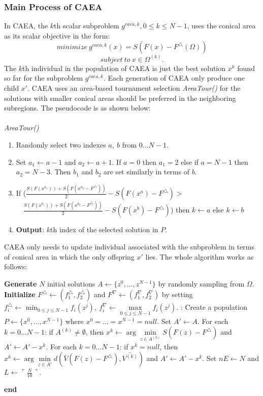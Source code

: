 \documentclass[a4paper, 11pt]{article}
\renewcommand{\End}{\kill\addtocounter{indent}{-1}\liprint\textbf{end} }
\begin{document}
\subsubsection{Main Process of CAEA}
In CAEA, the $k$th scalar subproblem $g^{caea,k},0\le k\le N-1$, uses the conical area as its scalar objective in the form:
$$
minimize\ g^{caea,k}(x)=S(F(x)-F^\triangle(\Omega))
$$
\begin{equation}
subject\ to\ x\in\Omega^{(k)}.
\end{equation}
The $k$th individual in the population of CAEA is just the best solution $x^k$ found so far for the subproblem $g^{caea,k}$. Each generation of CAEA only produce one child $x'$. CAEA uses an area-based tournament selection \emph{AreaTour()} for the solutions with smaller conical areas should be preferred in the neighboring subregions. The pseudocode is as shown below:\\
\\
\emph{AreaTour()}
\begin{enumerate}[~~~1)]
\item Randomly select two indexes $a,\ b$ from $0\ldots N-1$.
\item Set $a_1\gets a-1$ and $a_2\gets a+1$. If $a=0$ then $a_1=2$ else if $a=N-1$ then $a_2=N-3$. Then $b_1$ and $b_2$ are set similarly in terms of $b$.
\item If ($\frac{S(F(x^{a_1}))+S(F(x^{a_2}-F^\triangle))}{2}-S(F(x^a)-F^\triangle)>$\\
$\quad\frac{S(F(x^{b_1}))+S(F(x^{b_2}-F^\triangle))}{2}-S(F(x^b)-F^\triangle)$) then $k\gets a$ else $k\gets b$
\item \textbf{Output}: $k$th index of the selected solution in $P$.
\end{enumerate}
CAEA only needs to update individual associated with the subproblem in terms of conical area in which the only offspring $x'$ lies. The whole algorithm works as follows:

\begin{codebox}
\li \Do
\li \textbf{Generate} $N$ initial solutions $A\gets\{z^0,\ldots,z^{N-1}\}$
\li by randomly sampling from $\Omega$.
\li
\li \textbf{Initialize} $F^\triangle\gets(f^\triangle_1,f^\triangle_2)$ and $F^\nabla\gets(f^\nabla_1,f^\nabla_2)$
\li by setting $f^\triangle_i\gets\min_{0\le j\le N-1}f_i(z^j),\ f^\nabla_i\gets\max\limits_{0\le j\le N-1}f_i(z^j)$.
\li
\li {}:
\li Create a population $P\gets\{x^0,\ldots,x^{N-1}\}$
\li where $x^0=\ldots=x^{N-1}=null$.
\li Set $A'\gets A$.
\li
\li For each$k=0\ldots N-1$: if $A^{(k)}\neq\emptyset$,
\li then $x^k\gets\arg \min\limits_{z\in A^{(k)}}S(F(z)-F^\triangle)$ and $A'\gets A'-x^k$.
\li
\li For each $k=0\ldots N-1$: if $x^k=null$,
\li then $x^k\gets\arg \min\limits_{z\in A'}d(\bar{V}(F(z)-F^\triangle),\bar{V^{(k)}})$ \label{caea:step1d}
\li and $A'\gets A'-x^k$.
\li
\li Set $nE\gets N$ and $L\gets \ulcorner\frac{N}{10}\urcorner$.
\li \End
\end{codebox}
\end{document}
